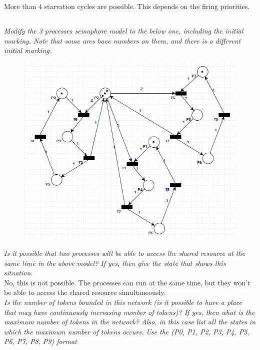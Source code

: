 \documentclass[letterpaper]{article}
\begin{document}
More than 4 starvation cycles are possible.
This depends on the firing priorities.




\subsection{}
\textit{Modify the 3 processes semaphore model to the below one, including the initial marking.
 Note that some arcs have numbers on them, and there is a different initial marking.
}

\begin{figure}[H]
 \centering
 \includegraphics[width=\textwidth]{image5.png}
\end{figure}

\textit{Is it possible that two processes will be able to access the shared resource at the same time in the above model? If yes, then give the state that shows this situation.}\\


No, this is not possible. The processes can run at the same time,
but they won't be able to access the shared resource simultaneously.\\

\textit{Is the number of tokens bounded in this network (is it possible to have a place that may have continuously increasing number of tokens)? If yes, then what is the maximum number of tokens in the network? Also, in this case list all the states in which the maximum number of tokens occurs.
 Use the (P0, P1, P2, P3, P4, P5, P6, P7, P8, P9) format
}\\
\end{document}
